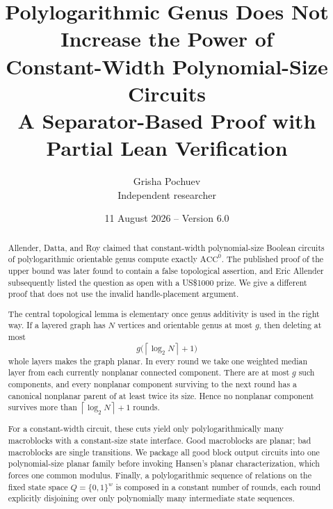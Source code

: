 \documentclass[11pt]{article}
\title{Polylogarithmic Genus Does Not Increase the Power of\\
Constant-Width Polynomial-Size Circuits\\
\large A Separator-Based Proof with Partial Lean Verification}
\author{Grisha Pochuev\\\small Independent researcher}
\date{11 August 2026 -- Version 6.0}
\theoremstyle{definition}
\newcommand{\ACC}{\mathrm{ACC}^{0}}
\newcommand{\bits}{\{0,1\}}
\newcommand{\ceil}[1]{\left\lceil #1\right\rceil}
\begin{document}
\maketitle

\begin{abstract}
Allender, Datta, and Roy claimed that constant-width polynomial-size Boolean
circuits of polylogarithmic orientable genus compute exactly $\ACC$.  The
published proof of the upper bound was later found to contain a false
topological assertion, and Eric Allender subsequently listed the question as
open with a US\$1000 prize.  We give a different proof that does not use the
invalid handle-placement argument.

The central topological lemma is elementary once genus additivity is used in
the right way.  If a layered graph has $N$ vertices and orientable genus at
most $g$, then deleting at most
\[
  g\bigl(\ceil{\log_2 N}+1\bigr)
\]
whole layers makes the graph planar.  In every round we take one weighted
median layer from each currently nonplanar connected component.  There are at
most $g$ such components, and every nonplanar component surviving to the next
round has a canonical nonplanar parent of at least twice its size.  Hence no
nonplanar component survives more than $\ceil{\log_2 N}+1$ rounds.

For a constant-width circuit, these cuts yield only polylogarithmically many
macroblocks with a constant-size state interface.  Good macroblocks are
planar; bad macroblocks are single transitions.  We package all good block
output circuits into one polynomial-size planar family before invoking
Hansen's planar characterization, which forces one common modulus.  Finally,
a polylogarithmic sequence of relations on the fixed state space
$Q=\bits^w$ is composed in a constant number of rounds, each round explicitly
disjoining over only polynomially many intermediate state sequences.


\end{abstract}
\end{document}
